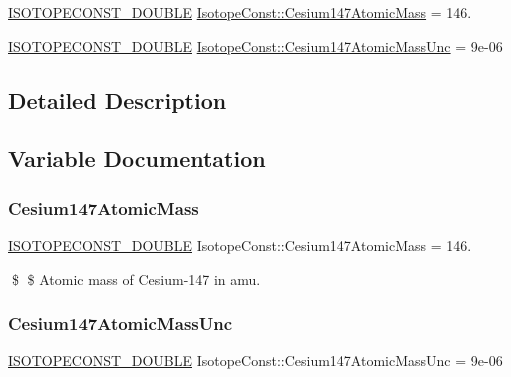 \begin{DoxyCompactItemize}
\item 
\mbox{\hyperlink{group___isotope_const-_macros_ga8f45a7272ce02c0b4c65c44636ed719a}{I\+S\+O\+T\+O\+P\+E\+C\+O\+N\+S\+T\+\_\+\+D\+O\+U\+B\+LE}} \mbox{\hyperlink{group___isotope_const-_cesium-_cs147_gac6534c42edcebaa31b9ca9d432b81b70}{Isotope\+Const\+::\+Cesium147\+Atomic\+Mass}} = 146.
\item 
\mbox{\hyperlink{group___isotope_const-_macros_ga8f45a7272ce02c0b4c65c44636ed719a}{I\+S\+O\+T\+O\+P\+E\+C\+O\+N\+S\+T\+\_\+\+D\+O\+U\+B\+LE}} \mbox{\hyperlink{group___isotope_const-_cesium-_cs147_ga033649ed371ccd18382b27e8806a62a0}{Isotope\+Const\+::\+Cesium147\+Atomic\+Mass\+Unc}} = 9e-\/06
\end{DoxyCompactItemize}


\subsection{Detailed Description}


\subsection{Variable Documentation}
\mbox{\label{group___isotope_const-_cesium-_cs147_gac6534c42edcebaa31b9ca9d432b81b70}} 
\subsubsection{\texorpdfstring{Cesium147\+Atomic\+Mass}{Cesium147AtomicMass}}
{\footnotesize\ttfamily \mbox{\hyperlink{group___isotope_const-_macros_ga8f45a7272ce02c0b4c65c44636ed719a}{I\+S\+O\+T\+O\+P\+E\+C\+O\+N\+S\+T\+\_\+\+D\+O\+U\+B\+LE}} Isotope\+Const\+::\+Cesium147\+Atomic\+Mass = 146.}

\$ \$ Atomic mass of Cesium-\/147 in amu. \mbox{\label{group___isotope_const-_cesium-_cs147_ga033649ed371ccd18382b27e8806a62a0}} 
\subsubsection{\texorpdfstring{Cesium147\+Atomic\+Mass\+Unc}{Cesium147AtomicMassUnc}}
{\footnotesize\ttfamily \mbox{\hyperlink{group___isotope_const-_macros_ga8f45a7272ce02c0b4c65c44636ed719a}{I\+S\+O\+T\+O\+P\+E\+C\+O\+N\+S\+T\+\_\+\+D\+O\+U\+B\+LE}} Isotope\+Const\+::\+Cesium147\+Atomic\+Mass\+Unc = 9e-\/06}

